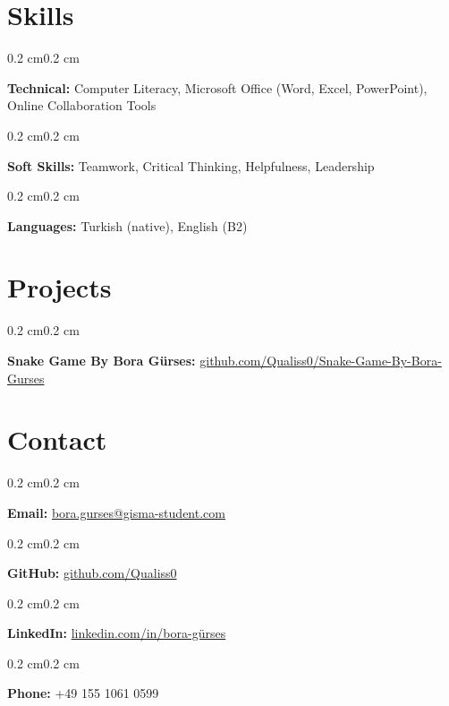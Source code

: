 \documentclass[10pt, letterpaper]{article}
\newenvironment{onecolentry}{
    \begin{adjustwidth}{0.2 cm}{0.2 cm}
}{
    \end{adjustwidth}
}
\begin{document}
\section{Skills}
\begin{onecolentry}
\textbf{Technical:} Computer Literacy, Microsoft Office (Word, Excel, PowerPoint), Online Collaboration Tools
\end{onecolentry}

\vspace{0.1cm}

\begin{onecolentry}
\textbf{Soft Skills:} Teamwork, Critical Thinking, Helpfulness, Leadership
\end{onecolentry}

\vspace{0.1cm}

\begin{onecolentry}
\textbf{Languages:} Turkish (native), English (B2)
\end{onecolentry}

\section{Projects}
\begin{onecolentry}
\textbf{Snake Game By Bora Gürses:} \href{https://github.com/Qualiss0/Snake-Game-By-Bora-Gurses}{github.com/Qualiss0/Snake-Game-By-Bora-Gurses}
\end{onecolentry}


\section{Contact}
\begin{onecolentry}
\textbf{Email:} \href{mailto:bora.gurses@gisma-student.com}{bora.gurses@gisma-student.com}
\end{onecolentry}
\begin{onecolentry}
\textbf{GitHub:} \href{https://github.com/Qualiss0}{github.com/Qualiss0}
\end{onecolentry}
\begin{onecolentry}
\textbf{LinkedIn:} \href{https://linkedin.com/in/bora-gürses-29b0232ba}{linkedin.com/in/bora-gürses}
\end{onecolentry}
\begin{onecolentry}
\textbf{Phone:} +49 155 1061 0599
\end{onecolentry}
\end{document}
